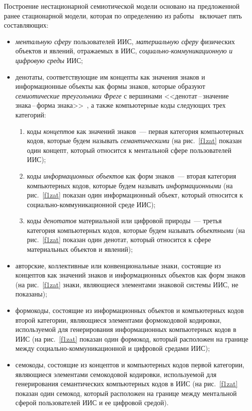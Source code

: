 \begin{multicols}{2}
   Построение нестационарной семиотической модели основано на предложенной ранее 
стационарной модели, которая по определению из работы~\cite{2zat} включает пять 
составляющих:
   \begin{itemize}
\item \textit{ментальную сферу} пользователей ИИС, \textit{материальную сферу} 
физических объектов и явлений, отражаемых в ИИС, 
\textit{социально-ком\-му\-ни\-ка\-ци\-он\-ную и цифровую среды} ИИС;
\item денотаты, соответствующие им концепты как значения знаков и 
информационные объекты как формы знаков, которые образуют 
\textit{семиотические треугольники Фреге} с вершинами <<денотат\,--\,значение 
знака\,--\,форма знака>>~\cite{8zat, 9zat}, а также компьютерные коды 
следующих трех категорий:
\begin{enumerate}[(1)]
\item
коды \textit{концептов} как значений знаков~--- первая категория 
компьютерных кодов, которые будем называть \textit{семантическими} (на 
рис.~\ref{f1zat} показан один концепт, который относится к ментальной 
сфере пользователей ИИС);\\[-15pt]
\item коды \textit{информационных объектов} как форм знаков~--- вторая 
категория компьютерных кодов, которые будем называть 
\textit{информационными} (на рис.~\ref{f1zat} показан один 
информационный объект, который относится к 
со\-ци\-аль\-но-ком\-му\-ни\-ка\-ци\-он\-ной среде ИИС);\\[-15pt]
\item коды \textit{денотатов} материальной или цифровой природы~--- 
третья категория компьютерных кодов, которые будем называть 
\textit{объектными} (на рис.~\ref{f1zat} показан один денотат, который 
относится к сфере материальных объектов и явлений);\\[-15pt]
\end{enumerate}
\item авторские, коллективные или конвенциональные знаки, состоящие из 
концептов как значений знаков и информационных объектов как форм знаков (на 
рис.~\ref{f1zat} знаки, являющиеся элементами знаковой системы ИИС, не 
пока\-заны); %
\item формокоды, состоящие из информационных объектов и компьютерных кодов 
второй категории, являющиеся элементами формокодовой кодировки, 
используемой для генерирования информационных компьютерных кодов в ИИС 
(на рис.~\ref{f1zat} показан один формокод, который расположен на границе 
между со\-ци\-аль\-но-ком\-му\-ни\-ка\-ци\-он\-ной и цифровой средами ИИС);
\item семокоды, состоящие из концептов и компьютерных кодов первой категории, 
являющиеся элементами семокодовой кодировки, используемой для 
генерирования семантических компьютерных кодов в ИИС (на рис.~\ref{f1zat} 
показан один семокод, который расположен на границе между ментальной сферой 
пользователей ИИС и ее цифровой средой). %
\end{itemize}


\end{multicols}
